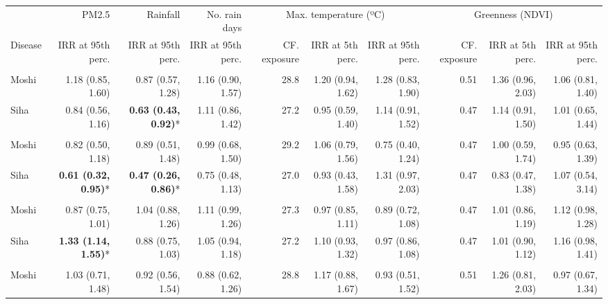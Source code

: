 \begin{table}[t]
\fontsize{12.0pt}{14.4pt}\selectfont
\begin{tabular*}{\linewidth}{@{\extracolsep{\fill}}l|rrrrrrrrr}
\toprule
 & PM2.5 & Rainfall & No. rain days & \multicolumn{3}{c}{Max. temperature (ºC)} & \multicolumn{3}{c}{Greenness (NDVI)} \\ 
\cmidrule(lr){2-2} \cmidrule(lr){3-3} \cmidrule(lr){4-4} \cmidrule(lr){5-7} \cmidrule(lr){8-10}
Disease & IRR at 95th perc. & IRR at 95th perc. & IRR at 95th perc. & CF. exposure & IRR at 5th perc. & IRR at 95th perc. & CF. exposure & IRR at 5th perc. & IRR at 95th perc. \\ 
\midrule\addlinespace[2.5pt]
\multicolumn{10}{l}{Pneumonia, Severe} \\[2.5pt] 
\midrule\addlinespace[2.5pt]
Moshi & 1.18 (0.85, 1.60) & 0.87 (0.57, 1.28) & 1.16 (0.90, 1.57) & 28.8 & 1.20 (0.94, 1.62) & 1.28 (0.83, 1.90) & 0.51 & 1.36 (0.96, 2.03) & 1.06 (0.81, 1.40) \\ 
Siha & 0.84 (0.56, 1.16) & \textbf{0.63 (0.43, 0.92)}* & 1.11 (0.86, 1.42) & 27.2 & 0.95 (0.59, 1.40) & 1.14 (0.91, 1.52) & 0.47 & 1.14 (0.91, 1.50) & 1.01 (0.65, 1.44) \\ 
\midrule\addlinespace[2.5pt]
\multicolumn{10}{l}{Tuberculosis} \\[2.5pt] 
\midrule\addlinespace[2.5pt]
Moshi & 0.82 (0.50, 1.18) & 0.89 (0.51, 1.48) & 0.99 (0.68, 1.50) & 29.2 & 1.06 (0.79, 1.56) & 0.75 (0.40, 1.24) & 0.47 & 1.00 (0.59, 1.74) & 0.95 (0.63, 1.39) \\ 
Siha & \textbf{0.61 (0.32, 0.95)}* & \textbf{0.47 (0.26, 0.86)}* & 0.75 (0.48, 1.13) & 27.0 & 0.93 (0.43, 1.58) & 1.31 (0.97, 2.03) & 0.47 & 0.83 (0.47, 1.38) & 1.07 (0.54, 3.14) \\ 
\midrule\addlinespace[2.5pt]
\multicolumn{10}{l}{Skin Infection - Fungal} \\[2.5pt] 
\midrule\addlinespace[2.5pt]
Moshi & 0.87 (0.75, 1.01) & 1.04 (0.88, 1.26) & 1.11 (0.99, 1.26) & 27.3 & 0.97 (0.85, 1.11) & 0.89 (0.72, 1.08) & 0.47 & 1.01 (0.86, 1.19) & 1.12 (0.98, 1.28) \\ 
Siha & \textbf{1.33 (1.14, 1.55)}* & 0.88 (0.75, 1.03) & 1.05 (0.94, 1.18) & 27.2 & 1.10 (0.93, 1.32) & 0.97 (0.86, 1.08) & 0.47 & 1.01 (0.90, 1.12) & 1.16 (0.98, 1.41) \\ 
\midrule\addlinespace[2.5pt]
\multicolumn{10}{l}{Malnutrition} \\[2.5pt] 
\midrule\addlinespace[2.5pt]
Moshi & 1.03 (0.71, 1.48) & 0.92 (0.56, 1.54) & 0.88 (0.62, 1.26) & 28.8 & 1.17 (0.88, 1.67) & 0.93 (0.51, 1.52) & 0.51 & 1.26 (0.81, 2.03) & 0.97 (0.67, 1.34) \\ 

\end{tabular*}
\end{table}
